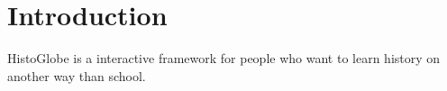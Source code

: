 \section{Introduction}
HistoGlobe is a interactive framework for people who want to learn history on another way than school.


